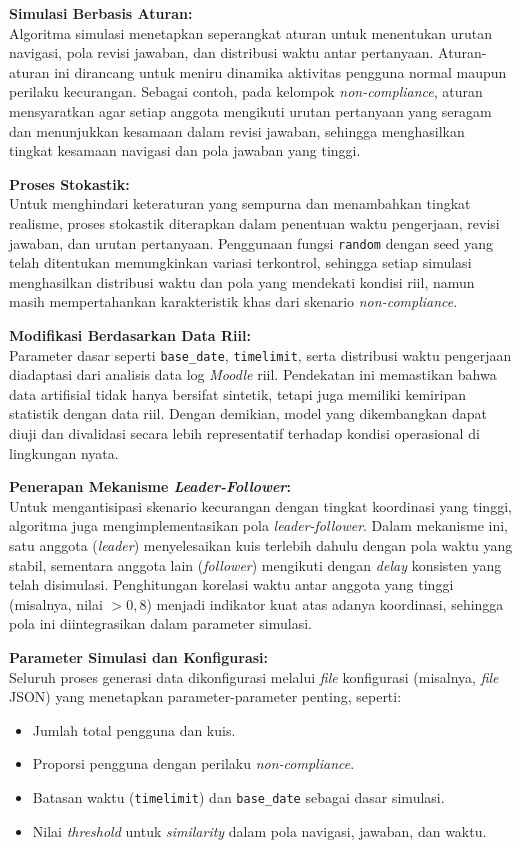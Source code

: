 \textbf{Simulasi Berbasis Aturan:} \\
Algoritma simulasi menetapkan seperangkat aturan untuk menentukan urutan navigasi, pola revisi jawaban, dan distribusi waktu antar pertanyaan. Aturan-aturan ini dirancang untuk meniru dinamika aktivitas pengguna normal maupun perilaku kecurangan. Sebagai contoh, pada kelompok \textit{non-compliance}, aturan mensyaratkan agar setiap anggota mengikuti urutan pertanyaan yang seragam dan menunjukkan kesamaan dalam revisi jawaban, sehingga menghasilkan tingkat kesamaan navigasi dan pola jawaban yang tinggi.

\textbf{Proses Stokastik:} \\
Untuk menghindari keteraturan yang sempurna dan menambahkan tingkat realisme, proses stokastik diterapkan dalam penentuan waktu pengerjaan, revisi jawaban, dan urutan pertanyaan. Penggunaan fungsi \texttt{random} dengan seed yang telah ditentukan memungkinkan variasi terkontrol, sehingga setiap simulasi menghasilkan distribusi waktu dan pola yang mendekati kondisi riil, namun masih mempertahankan karakteristik khas dari skenario \textit{non-compliance}.

\textbf{Modifikasi Berdasarkan Data Riil:} \\
Parameter dasar seperti \texttt{base\_date}, \texttt{timelimit}, serta distribusi waktu pengerjaan diadaptasi dari analisis data log \textit{Moodle} riil. Pendekatan ini memastikan bahwa data artifisial tidak hanya bersifat sintetik, tetapi juga memiliki kemiripan statistik dengan data riil. Dengan demikian, model yang dikembangkan dapat diuji dan divalidasi secara lebih representatif terhadap kondisi operasional di lingkungan nyata.

\textbf{Penerapan Mekanisme \textit{Leader-Follower}:} \\
Untuk mengantisipasi skenario kecurangan dengan tingkat koordinasi yang tinggi, algoritma juga mengimplementasikan pola \textit{leader-follower}. Dalam mekanisme ini, satu anggota (\textit{leader}) menyelesaikan kuis terlebih dahulu dengan pola waktu yang stabil, sementara anggota lain (\textit{follower}) mengikuti dengan \textit{delay} konsisten yang telah disimulasi. Penghitungan korelasi waktu antar anggota yang tinggi (misalnya, nilai $> 0,8$) menjadi indikator kuat atas adanya koordinasi, sehingga pola ini diintegrasikan dalam parameter simulasi.

\textbf{Parameter Simulasi dan Konfigurasi:} \\
Seluruh proses generasi data dikonfigurasi melalui \textit{file} konfigurasi (misalnya, \textit{file} JSON) yang menetapkan parameter-parameter penting, seperti:
\begin{itemize}
    \item Jumlah total pengguna dan kuis.
    \item Proporsi pengguna dengan perilaku \textit{non-compliance}.
    \item Batasan waktu (\texttt{timelimit}) dan \texttt{base\_date} sebagai dasar simulasi.
    \item Nilai \textit{threshold} untuk \textit{similarity} dalam pola navigasi, jawaban, dan waktu.
\end{itemize}

